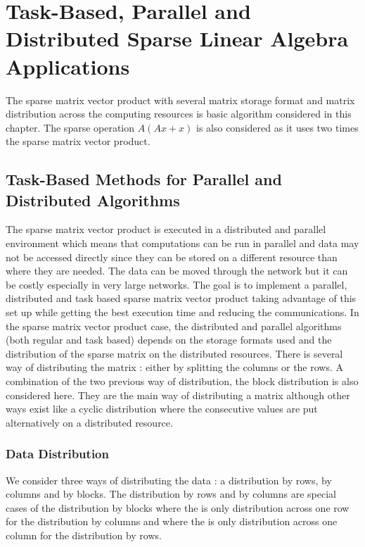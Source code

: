 %
\newcommand{\Array}{\KwSty{Array}}
\newcommand{\Integer}{\KwSty{Integer}}

\chapter{Task-Based, Parallel and Distributed Sparse Linear Algebra Applications \label{chap:exp_sparse}}
\graphicspath{{chapters/exp_sparse/}}

The sparse matrix vector product with several matrix storage format and matrix distribution across the computing resources is basic algorithm considered in this chapter.
The sparse operation $A(Ax+x)$ is also considered as it uses two times the sparse matrix vector product.


\section{Task-Based Methods for Parallel and Distributed Algorithms}
The sparse matrix vector product is executed in a distributed and parallel environment which means that computations can be run in parallel and data may not be accessed directly since they can be stored on a different resource than where they are needed.
The data can be moved through the network but it can be costly especially in very large networks.
The goal is to implement a parallel, distributed and task based sparse matrix vector product taking advantage of this set up while getting the best execution time and reducing the communications.
In the sparse matrix vector product case, the distributed and parallel algorithms (both regular and task based) depends on the storage formats used and the distribution of the sparse matrix on the distributed resources.
There is several way of distributing the matrix : either by splitting the columns or the rows.
A combination of the two previous way of distribution, the block distribution is also considered here.
They are the main way of distributing a matrix although other ways exist like a cyclic distribution where the consecutive values are put alternatively on a distributed resource.


\subsection{Data Distribution \label{sec:sla:data_distribution}}

We consider three ways of distributing the data : a distribution by rows, by columns and by blocks.
The distribution by rows and by columns are special cases of the distribution by blocks where the is only distribution across one row for the distribution by columns and where the is only distribution across one column for the distribution by rows.


